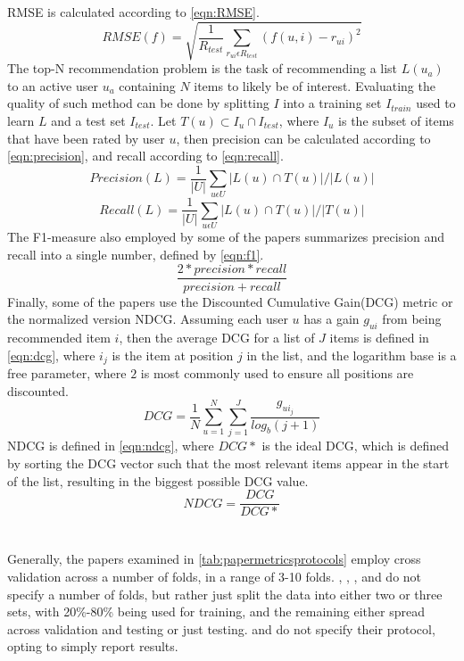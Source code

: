 RMSE is calculated according to \autoref{eqn:RMSE}.
\begin{equation}
    \label{eqn:RMSE}
    RMSE(f) = \sqrt{\frac{1}{R_{test}} \sum\limits_{r_{ui} \epsilon R_{test}} (f(u, i) - r_{ui})^2}
\end{equation}
The top-N recommendation problem is the task of recommending a list $L(u_a)$ to an active user $u_a$ containing $N$ items to likely be of interest.
Evaluating the quality of such method can be done by splitting $I$ into a training set $I_{train}$ used to learn $L$ and a test set $I_{test}$.
Let $T(u) \subset I_u \cap I_{test}$, where $I_u$ is the subset of items that have been rated by user $u$, then precision can be calculated according to \autoref{eqn:precision}, and recall according to \autoref{eqn:recall}.
\begin{equation}
    \label{eqn:precision}
    Precision(L) = \frac{1}{|U|} \sum\limits_{u \epsilon U} |L(u) \cap T(u)| / |L(u)|
\end{equation}
\begin{equation}
    \label{eqn:recall}
    Recall(L) = \frac{1}{|U|} \sum\limits_{u \epsilon U} |L(u) \cap T(u)| / |T(u)|
\end{equation}
The F1-measure also employed by some of the papers summarizes precision and recall into a single number, defined by \autoref{eqn:f1}.
\begin{equation}
    \label{eqn:f1}
    \frac{2*precision*recall}{precision+recall}
\end{equation}
Finally, some of the papers use the Discounted Cumulative Gain(DCG) metric or the normalized version NDCG.
Assuming each user $u$ has a gain $g_{ui}$ from being recommended item $i$, then the average DCG for a list of $J$ items is defined in \autoref{eqn:dcg}, where $i_j$ is the item at position $j$ in the list, and the logarithm base is a free parameter, where $2$ is most commonly used to ensure all positions are discounted.
\begin{equation}
    \label{eqn:dcg}
    DCG = \frac{1}{N} \sum\limits_{u=1}^N \sum\limits_{j = 1}^J \frac{g_{ui_j}}{log_b (j+1)}
\end{equation}
NDCG is defined in \autoref{eqn:ndcg}, where $DCG*$ is the ideal DCG, which is defined by sorting the DCG vector such that the most relevant items appear in the start of the list\cite{dcgpaper}, resulting in the biggest possible DCG value.
\begin{equation}
    \label{eqn:ndcg}
    NDCG = \frac{DCG}{DCG*}
\end{equation}
\\\\
Generally, the papers examined in \autoref{tab:papermetricsprotocols} employ cross validation across a number of folds, in a range of 3-10 folds.
\cite{GameTheoretic}, \cite{Soft-RoughArticle}, \cite{SinghUserItem}, \cite{StackedRecurrentNeuralPaper} and \cite{ContextualInfluencePaper} do not specify a number of folds, but rather just split the data into either two or three sets, with 20\%-80\% being used for training, and the remaining either spread across validation and testing or just testing.
\cite{AuxiliaryInformationPaper} and \cite{ArtificalBeePaper} do not specify their protocol, opting to simply report results.


